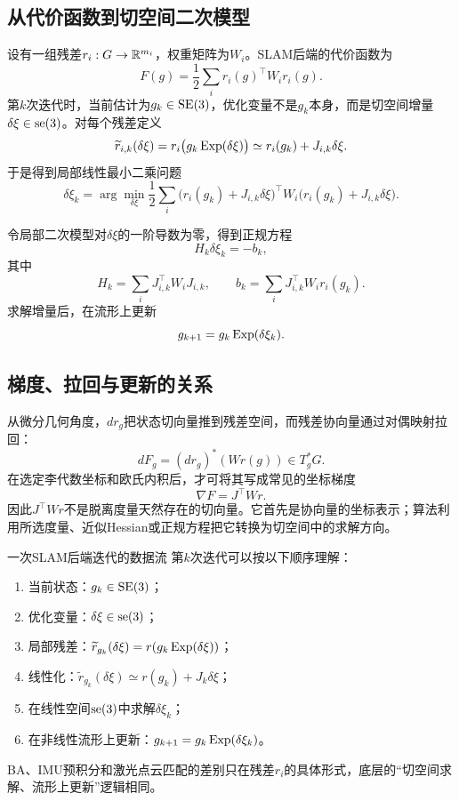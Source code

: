 \subsection{从代价函数到切空间二次模型}

设有一组残差$r_i:G\to\mathbb{R}^{m_i}$，权重矩阵为$W_i$。SLAM后端的代价函数为
\[
    F(g)=\frac12\sum_i r_i(g)^\top W_i r_i(g).
\]
第$k$次迭代时，当前估计为$g_k\in\operatorname{SE}(3)$，优化变量不是$g_k$本身，而是切空间增量$\delta\xi\in\operatorname{se}(3)$。对每个残差定义
\[
    \widetilde r_{i,k}(\delta\xi)
    =r_i\bigl(g_k\operatorname{Exp}(\delta\xi)\bigr)
    \simeq r_i(g_k)+J_{i,k}\delta\xi.
\]
于是得到局部线性最小二乘问题
\[
    \delta\xi_k
    =\arg\min_{\delta\xi}
    \frac12\sum_i
    \bigl(r_i(g_k)+J_{i,k}\delta\xi\bigr)^\top
    W_i
    \bigl(r_i(g_k)+J_{i,k}\delta\xi\bigr).
\]

令局部二次模型对$\delta\xi$的一阶导数为零，得到正规方程
\[
    H_k\delta\xi_k=-b_k,
\]
其中
\[
    H_k=\sum_iJ_{i,k}^\top W_iJ_{i,k},
    \qquad
    b_k=\sum_iJ_{i,k}^\top W_ir_i(g_k).
\]
求解增量后，在流形上更新
\[
    g_{k+1}=g_k\operatorname{Exp}(\delta\xi_k).
\]

\subsection{梯度、拉回与更新的关系}

从微分几何角度，$dr_g$把状态切向量推到残差空间，而残差协向量通过对偶映射拉回：
\[
    dF_g=(dr_g)^*(Wr(g))\in T_g^\ast G.
\]
在选定李代数坐标和欧氏内积后，才可将其写成常见的坐标梯度
\[
    \nabla F=J^\top Wr.
\]
因此$J^\top Wr$不是脱离度量天然存在的切向量。它首先是协向量的坐标表示；算法利用所选度量、近似Hessian或正规方程把它转换为切空间中的求解方向。

\begin{lieexample}{一次SLAM后端迭代的数据流}
第$k$次迭代可以按以下顺序理解：
\begin{enumerate}
    \item 当前状态：$g_k\in\operatorname{SE}(3)$；
    \item 优化变量：$\delta\xi\in\operatorname{se}(3)$；
    \item 局部残差：$\widetilde r_{g_k}(\delta\xi)=r(g_k\operatorname{Exp}(\delta\xi))$；
    \item 线性化：$\widetilde r_{g_k}(\delta\xi)\simeq r(g_k)+J_k\delta\xi$；
    \item 在线性空间$\operatorname{se}(3)$中求解$\delta\xi_k$；
    \item 在非线性流形上更新：$g_{k+1}=g_k\operatorname{Exp}(\delta\xi_k)$。
\end{enumerate}
BA、IMU预积分和激光点云匹配的差别只在残差$r_i$的具体形式，底层的“切空间求解、流形上更新”逻辑相同。
\end{lieexample}

